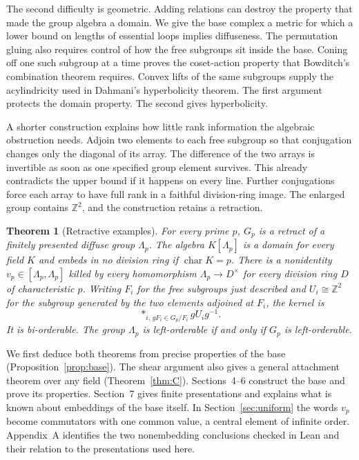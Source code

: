 \documentclass[11pt,a4paper]{article}
\newtheorem{maintheorem}{Theorem}
\numberwithin{equation}{section}
\newcommand{\Z}{\mathbb Z}
\begin{document}
The second difficulty is geometric. Adding relations can destroy the property that made the group algebra a domain. We give the base complex a metric for which a lower bound on lengths of essential loops implies diffuseness. The permutation gluing also requires control of how the free subgroups sit inside the base. Coning off one such subgroup at a time proves the coset-action property that Bowditch's combination theorem requires. Convex lifts of the same subgroups supply the acylindricity used in Dahmani's hyperbolicity theorem. The first argument protects the domain property. The second gives hyperbolicity.

A shorter construction explains how little rank information the algebraic obstruction needs. Adjoin two elements to each free subgroup so that conjugation changes only the diagonal of its array. The difference of the two arrays is invertible as soon as one specified group element survives. This already contradicts the upper bound if it happens on every line. Further conjugations force each array to have full rank in a faithful division-ring image. The enlarged group contains \(\Z^2\), and the construction retains a retraction.

\begin{maintheorem}[Retractive examples]\label{thm:B}
For every prime \(p\), \(G_p\) is a retract of a finitely presented diffuse group \(\Lambda_p\). The algebra \(K[\Lambda_p]\) is a domain for every field \(K\) and embeds in no division ring if \(\operatorname{char}K=p\). There is a nonidentity \(v_p\in[\Lambda_p,\Lambda_p]\) killed by every homomorphism \(\Lambda_p\to D^\times\) for every division ring \(D\) of characteristic \(p\). Writing \(F_i\) for the free subgroups just described and \(U_i\cong\Z^2\) for the subgroup generated by the two elements adjoined at \(F_i\), the kernel is
\[
           \mathop{\ast}_{i,\,gF_i\in G_p/F_i}gU_i g^{-1}.
\]
It is bi-orderable. The group \(\Lambda_p\) is left-orderable if and only if \(G_p\) is left-orderable.
\end{maintheorem}

We first deduce both theorems from precise properties of the base (Proposition~\ref{prop:base}). The shear argument also gives a general attachment theorem over any field (Theorem~\ref{thm:C}). Sections~4--6 construct the base and prove its properties. Section~7 gives finite presentations and explains what is known about embeddings of the base itself. In Section~\ref{sec:uniform} the words \(v_p\) become commutators with one common value, a central element of infinite order. Appendix~A identifies the two nonembedding conclusions checked in Lean and their relation to the presentations used here.
\end{document}
